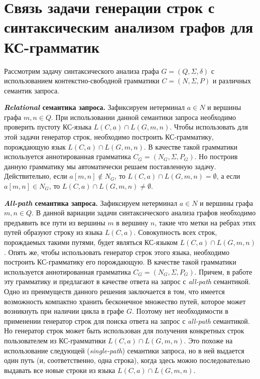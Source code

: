\section{Связь задачи генерации строк с синтаксическим анализом графов для КС-грамматик}

Рассмотрим задачу синтаксического анализа графа $G = (Q, \Sigma, \delta)$ с использованием контекстно-свободной грамматики $C = (N, \Sigma, P)$ и различных семантик запроса.

\textbf{\textit{Relational} семантика запроса.} Зафиксируем нетерминал $a \in N$ и вершины графа $m, n \in Q$. При использовании данной семантики запроса необходимо проверить пустоту КС-языка $L(C,a) \cap L(G,m,n)$. Чтобы использовать для этой задачи генератор строк, необходимо построить КС-грамматику, порождающую язык $L(C,a) \cap L(G,m,n)$. В качестве такой грамматики используется аннотированная грамматика $C_{G} = (N_{G}, \Sigma, P_{G})$. Но построив данную грамматику мы автоматически решаем поставленную задачу. Действительно, если $a[m,n] \notin N_{G}$, то $L(C,a) \cap L(G,m,n) = \emptyset$, а если $a[m,n] \in N_{G}$, то $L(C,a) \cap L(G,m,n) \ne \emptyset$.

\textbf{\textit{All-path} семантика запроса.} Зафиксируем нетерминал $a \in N$ и вершины графа $m, n \in Q$. В данной вариации задачи синтаксического анализа графов необходимо предъявить все пути из вершины $m$ в вершину $n$, такие что метки на ребрах этих путей образуют строку из языка $L(C,a)$. Совокупность всех строк, порождаемых такими путями, будет являться КС-языком $L(C,a) \cap L(G,m,n)$. Опять же, чтобы использовать генератор строк этого языка, необходимо построить КС-грамматику его порождающую. В качестве такой грамматики используется аннотированная грамматика $C_{G} = (N_{G}, \Sigma, P_{G})$. Причем, в работе~\cite{azimov-spbu-hellings2} эту грамматику и предлагают в качестве ответа на запрос с \textit{all-path} семантикой. Одно из преимуществ данного решения заключается в том, что имеется возможность компактно хранить бесконечное множество путей, которое может возникнуть при наличии цикла в графе $G$. Поэтому нет необходимости в применении генератор строк для поиска ответа на запрос с \textit{all-path} семантикой. Но генератор строк может быть использован для получения конкретных строк пользователем из КС-грамматики $L(C,a) \cap L(G,m,n)$. Это похоже на использование следующей (\textit{single-path}) семантики запроса, но в ней выдается один путь (и, соответственно, одна строка), когда здесь можно последовательно выдавать все новые строки из языка $L(C,a) \cap L(G,m,n)$.

